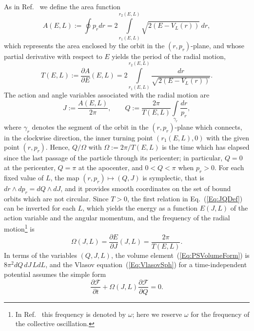 As in Ref.~\cite{pRoS20} we define the area function
\begin{equation}
A(E,L) := \oint p_r dr = 2\int\limits_{r_1(E,L)}^{r_2(E,L)} \sqrt{2(E - V_L(r))}\, dr,
\label{Eq:AreaFunction}
\end{equation}
which represents the area enclosed by the orbit in the $(r,p_r)$-plane, and whose partial derivative with respect to $E$ yields the period of the radial motion,
\begin{equation}
T(E,L) := \frac{\partial A}{\partial E}(E,L) = 2\int\limits_{r_1(E,L)}^{r_2(E,L)} \frac{dr}{\sqrt{2(E - V_L(r))}}.
\label{Eq:TDef}
\end{equation}
The action and angle variables associated with the radial motion are
\begin{equation}
J := \frac{A(E,L)}{2\pi},\qquad
Q := \frac{2\pi}{T(E,L)}\int\limits_{\gamma_r} \frac{dr}{p_r},
\label{Eq:JQDef}
\end{equation}
where $\gamma_r$ denotes the segment of the orbit in the $(r,p_r)$-plane which connects, in the clockwise direction, the inner turning point $(r_1(E,L),0)$ with the given point $(r,p_r)$. Hence, $Q/\Omega$ with $\Omega := 2\pi/T(E,L)$ is the time which has elapsed since the last passage of the particle through its pericenter; in particular, $Q = 0$ at the pericenter, $Q = \pi$ at the apocenter, and $0 < Q < \pi$ when $p_r > 0$. For each fixed value of $L$, the map $(r,p_r)\mapsto (Q,J)$ is symplectic, that is $dr\wedge dp_r = dQ\wedge dJ$, and it provides smooth coordinates on the set of bound orbits which are not circular. Since $T > 0$, the first relation in Eq.~(\ref{Eq:JQDef}) can be inverted for each $L$, which yields the energy as a function $E(J,L)$ of the action variable and the angular momentum, and the frequency of the radial motion\footnote{In Ref.~\cite{pRoS20} this frequency is denoted by $\omega$; here we reserve $\omega$ for the frequency of the collective oscillation.} is
\begin{equation}
\Omega(J,L) = \frac{\partial E}{\partial J}(J,L) = \frac{2\pi}{T(E,L)}.
\label{Eq:OmegaDef}
\end{equation}
In terms of the variables $(Q,J,L)$, the volume element~(\ref{Eq:PSVolumeForm}) is $8\pi^2 dQ\, dJ\, L dL$, and the Vlasov equation~(\ref{Eq:VlasovSph}) for a time-independent potential assumes the simple form
\begin{equation}
\frac{\partial \mathcal{F}}{\partial t} + \Omega(J,L)\frac{\partial \mathcal{F}}{\partial Q} = 0.
\label{Eq:VlasovAA}
\end{equation}
